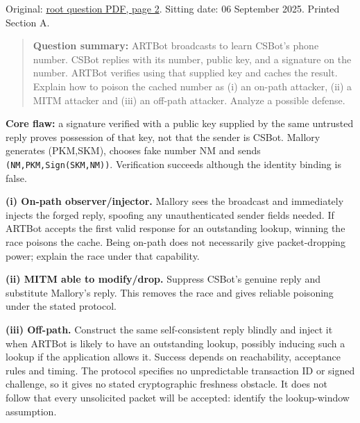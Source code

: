 \documentclass[11pt,a4paper]{article}
\begin{document}
Original: \href{../../CSE405-Security_Merged.pdf\#page=2}{root question PDF,\allowbreak{} page 2}. Sitting date: 06 September 2025. Printed Section A.



\begin{quote}\small

\textbf{Question summary:} ARTBot broadcasts to learn CSBot’s phone number. CSBot replies with its number,\allowbreak{} public key,\allowbreak{} and a signature on the number. ARTBot verifies using that supplied key and caches the result. Explain how to poison the cached number as (i) an on-path attacker,\allowbreak{} (ii) a MITM attacker and (iii) an off-path attacker. Analyze a possible defense.



\end{quote}

\textbf{Core flaw:} a signature verified with a public key supplied by the same untrusted reply proves possession of that key,\allowbreak{} not that the sender is CSBot. Mallory generates (PKM,\allowbreak{}SKM),\allowbreak{} chooses fake number NM and sends \texttt{(NM,\allowbreak{}PKM,\allowbreak{}Sign(SKM,\allowbreak{}NM))}. Verification succeeds although the identity binding is false.


\textbf{(i) On-path observer/\allowbreak{}injector.} Mallory sees the broadcast and immediately injects the forged reply,\allowbreak{} spoofing any unauthenticated sender fields needed. If ARTBot accepts the first valid response for an outstanding lookup,\allowbreak{} winning the race poisons the cache. Being on-path does not necessarily give packet-dropping power; explain the race under that capability.


\textbf{(ii) MITM able to modify/\allowbreak{}drop.} Suppress CSBot’s genuine reply and substitute Mallory’s reply. This removes the race and gives reliable poisoning under the stated protocol.


\textbf{(iii) Off-path.} Construct the same self-consistent reply blindly and inject it when ARTBot is likely to have an outstanding lookup,\allowbreak{} possibly inducing such a lookup if the application allows it. Success depends on reachability,\allowbreak{} acceptance rules and timing. The protocol specifies no unpredictable transaction ID or signed challenge,\allowbreak{} so it gives no stated cryptographic freshness obstacle. It does not follow that every unsolicited packet will be accepted: identify the lookup-window assumption.
\end{document}
